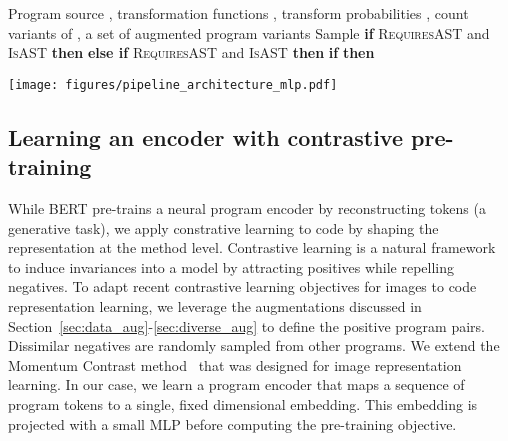 \documentclass{article}
\newcommand{\ours}[0]{ContraCode}
\begin{document}
\begin{algorithm}
\small
   \caption{\textbf{Transformation dropout}: Stochastic program augmentation with two encodings (AST or source).}
   \label{alg:transformation}
\begin{algorithmic}[1]
    Program source , transformation functions , transform probabilities , count 
     variants of 
   \STATE , a set of augmented program variants
        \STATE 
{}
   		    \STATE Sample 
   		    \IF{}
       		    \STATE \textbf{if} \textsc{RequiresAST} and \textsc{IsAST} \textbf{then} 
       		    \STATE \textbf{else if} \textsc{RequiresAST} and \textsc{IsAST} \textbf{then} 
\STATE 
    	    \ENDIF{}
   		\ENDFOR{}
   		\STATE \textbf{if}  \textbf{then} 
   		\STATE 
   \ENDFOR{}
\end{algorithmic}
\end{algorithm} 
\begin{figure*}[t]
    \centering
    \texttt{[image: figures/pipeline\_architecture\_mlp.pdf]}
    \caption{\ours{} pre-trains a neural program encoder  and transfers it to downstream tasks. \textbf{A-B.} Unlabeled programs are transformed \textbf{C.} into augmented variants. \textbf{D.} We pre-train  by maximizing similarity of projected embeddings of \textit{positive} program pairs--variants of the same program--and minimizing similarity with a queue of cached negatives. \textbf{E.} \ours{} supports any architecture for  that produces a global program embedding such as Transformers and LSTMs.  is then fine-tuned on smaller labeled datasets.}
    \label{fig:training}
\end{figure*}

\subsection{Learning an encoder with contrastive pre-training} \label{infonce_loss}
While BERT pre-trains a neural program encoder by reconstructing tokens (a generative task), we apply constrative learning to code by shaping the representation at the method level. Contrastive learning is a natural framework to induce invariances into a model by attracting positives while repelling negatives. To adapt recent contrastive learning objectives for images to code representation learning, we leverage the augmentations discussed in Section~\ref{sec:data_aug}-\ref{sec:diverse_aug} to define the positive program pairs. Dissimilar negatives are randomly sampled from other programs.
We extend the Momentum Contrast method~\citep{he2019momentum} that was designed for image representation learning. In our case, we learn a program encoder  that maps a sequence of program tokens to a single, fixed dimensional embedding. This embedding is projected with a small MLP before computing the pre-training objective.
\end{document}
